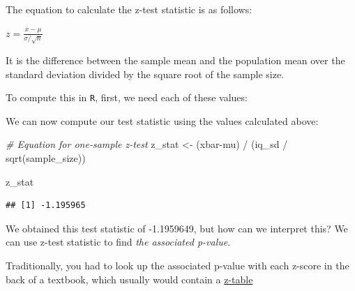 \documentclass[
]{book}
\newenvironment{Shaded}{\begin{snugshade}}{\end{snugshade}}
\newcommand{\CommentTok}[1]{\textcolor[rgb]{0.56,0.35,0.01}{\textit{#1}}}
\newcommand{\DecValTok}[1]{\textcolor[rgb]{0.00,0.00,0.81}{#1}}
\newcommand{\FunctionTok}[1]{\textcolor[rgb]{0.00,0.00,0.00}{#1}}
\newcommand{\NormalTok}[1]{#1}
\newcommand{\OtherTok}[1]{\textcolor[rgb]{0.56,0.35,0.01}{#1}}
\newcommand{\SpecialCharTok}[1]{\textcolor[rgb]{0.00,0.00,0.00}{#1}}
\begin{document}
The equation to calculate the z-test statistic is as follows:

\(z = \frac{\bar{x}-\mu}{\sigma/\sqrt{n}}\)

It is the difference between the sample mean and the population mean over the standard deviation divided by the square root of the sample size.

To compute this in \texttt{R}, first, we need each of these values:

\begin{Shaded}
\end{Shaded}

We can now compute our test statistic using the values calculated above:

\begin{Shaded}
\begin{Highlighting}[]
\CommentTok{\# Equation for one{-}sample z{-}test}
\NormalTok{z\_stat }\OtherTok{\textless{}{-}}\NormalTok{ (xbar}\SpecialCharTok{{-}}\NormalTok{mu) }\SpecialCharTok{/}\NormalTok{ (iq\_sd }\SpecialCharTok{/} \FunctionTok{sqrt}\NormalTok{(sample\_size)) }

\NormalTok{z\_stat}
\end{Highlighting}
\end{Shaded}

\begin{verbatim}
## [1] -1.195965
\end{verbatim}

We obtained this test statistic of -1.1959649, but how can we interpret this? We can use z-test statistic to find \emph{the associated p-value}.

Traditionally, you had to look up the associated p-value with each z-score in the back of a textbook, which usually would contain a \href{https://www.math.arizona.edu/~rsims/ma464/standardnormaltable.pdf}{z-table}
\end{document}
